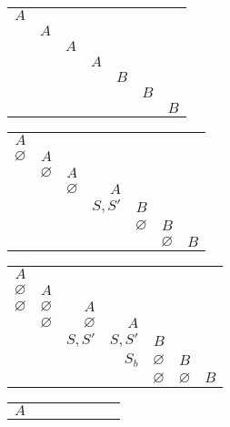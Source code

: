 \documentclass[12pt]{article}
\newenvironment{Problems}{
	\begin{enumerate}[]
	}{       
	\end{enumerate}
}
\begin{document}
\begin{Problems}
	\begin{center}
		\begin{tabular}{|r|r|r|r|r|r|r|}
			\cline{1-1}
			$A$\\
			\cline{1-2}
			& $A$\\
			\cline{1-3}
			& & $A$\\
			\cline{1-4}
			& & & $A$\\
			\cline{1-5}
			& & & & $B$\\
			\cline{1-6}
			& & & & & $B$\\
			\hline
			& & & & & & $B$\\
			\hline
		\end{tabular}
	\end{center}
	\begin{center}
		\begin{tabular}{|r|r|r|r|r|r|r|}
			\cline{1-1}
			$A$\\
			\cline{1-2}
			$\varnothing$ & $A$\\
			\cline{1-3}
			& $\varnothing$ & $A$\\
			\cline{1-4}
			& & $\varnothing$ & $A$\\
			\cline{1-5}
			& & & $S, S'$ & $B$\\
			\cline{1-6}
			& & & & $\varnothing$ & $B$\\
			\hline
			& & & & & $\varnothing$ & $B$\\
			\hline
		\end{tabular}
	\end{center}
	\begin{center}
		\begin{tabular}{|r|r|r|r|r|r|r|}
			\cline{1-1}
			$A$\\
			\cline{1-2}
			$\varnothing$ & $A$\\
			\cline{1-3}
			$\varnothing$ & $\varnothing$ & $A$\\
			\cline{1-4}
			& $\varnothing$ & $\varnothing$ & $A$\\
			\cline{1-5}
			& & $S, S'$ & $S, S'$ & $B$\\
			\cline{1-6}
			& & & $S_b$ & $\varnothing$ & $B$\\
			\hline
			& & & & $\varnothing$ & $\varnothing$ & $B$\\
			\hline
		\end{tabular}
	\end{center}
	\begin{center}
		\begin{tabular}{|r|r|r|r|r|r|r|}
			\cline{1-1}
			$A$\\

\end{tabular}
\end{center}
\end{Problems}
\end{document}
